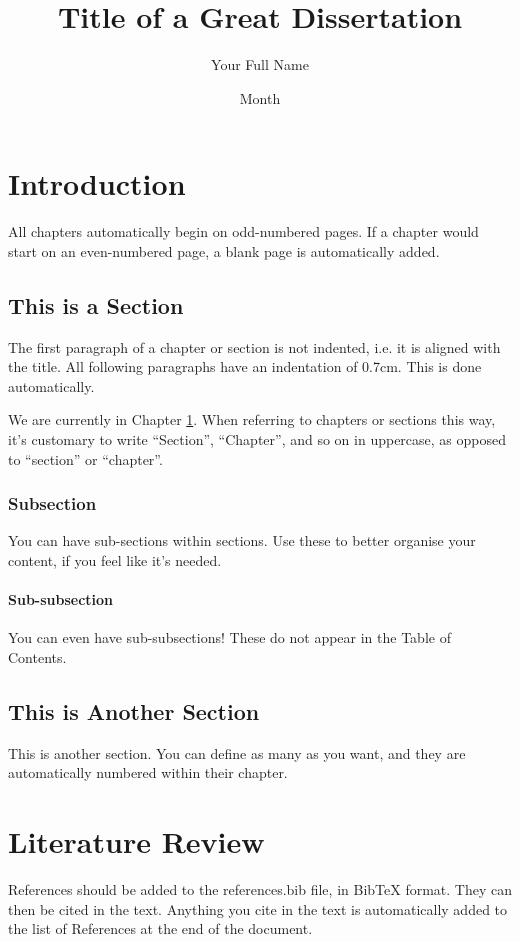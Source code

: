 \documentclass[12pt,reqno,twoside]{amsbook}
\title{Title of a Great Dissertation}
\author{Your Full Name}
\date{Month}{Year}
\begin{document}
\chapter{Introduction}\label{ch:introduction}
All chapters automatically begin on odd-numbered pages. If a chapter would start on an even-numbered page, a blank page is automatically added.

\section{This is a Section}\label{sec:example_section}
The first paragraph of a chapter or section is not indented, i.e. it is aligned with the title. All following paragraphs have an indentation of 0.7cm. This is done automatically.

We are currently in Chapter \ref{ch:introduction}. When referring to chapters or sections this way, it's customary to write ``Section'', ``Chapter'', and so on in uppercase, as opposed to ``section'' or ``chapter''.

\subsection{Subsection}
You can have sub-sections within sections. Use these to better organise your content, if you feel like it's needed.

\subsubsection{Sub-subsection}
You can even have sub-subsections! These do not appear in the Table of Contents.

\section{This is Another Section}

This is another section. You can define as many as you want, and they are automatically numbered within their chapter.










\chapter{Literature Review}\label{ch:literature_review}

References should be added to the references.bib file, in BibTeX format. They can then be cited in the text. Anything you cite in the text is automatically added to the list of References at the end of the document.
\end{document}
